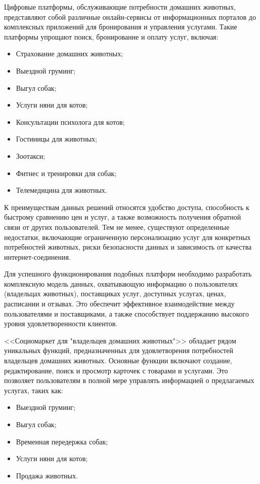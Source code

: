 Цифровые платформы, обслуживающие потребности домашних животных, представляют собой различные онлайн-сервисы от информационных порталов до комплексных приложений для бронирования и управления услугами. Такие платформы упрощают поиск, бронирование и оплату услуг, включая:

\begin{itemize}
  \item Страхование домашних животных;
  \item Выездной груминг;
  \item Выгул собак;
  \item Услуги няни для котов;
  \item Консультации психолога для котов;
  \item Гостиницы для животных;
  \item Зоотакси;
  \item Фитнес и тренировки для собак;
  \item Телемедицина для животных.
\end{itemize}

К преимуществам данных решений относятся удобство доступа, способность к быстрому сравнению цен и услуг, а также возможность получения обратной связи от других пользователей. Тем не менее, существуют определенные недостатки, включающие ограниченную персонализацию услуг для конкретных потребностей животных, риски безопасности данных и зависимость от качества интернет-соединения.

Для успешного функционирования подобных платформ необходимо разработать комплексную модель данных, охватывающую информацию о пользователях (владельцах животных), поставщиках услуг, доступных услугах, ценах, расписании и отзывах. Это обеспечит эффективное взаимодействие между пользователями и поставщиками, а также способствует поддержанию высокого уровня удовлетворенности клиентов.

<<Социомаркет для "владельцев домашних животных">> обладает рядом уникальных функций, предназначенных для удовлетворения потребностей владельцев домашних животных. Основные функции включают создание, редактирование, поиск и просмотр карточек с товарами и услугами. Это позволяет пользователям в полной мере управлять информацией о предлагаемых услугах, таких как:

\begin{itemize}
  \item Выездной груминг;
  \item Выгул собак;
  \item Временная передержка собак;
  \item Услуги няни для котов;
  \item Продажа животных.
\end{itemize}

